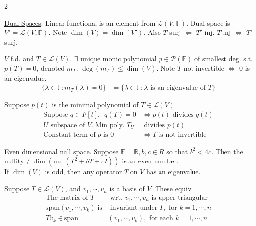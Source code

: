 \documentclass[a4paper,8pt]{extarticle} %
\newcommand{\mybox}[2]{
    \begin{tcolorbox}[colback=lightblue!5!white,colframe=lightblue!75!black,boxsep=1pt,arc=0pt,outer arc=0pt,coltext=black,title={\textcolor{black}{#1}}, before skip=2pt, after skip=2pt]
        #2
    \end{tcolorbox}
}
\begin{document}
\begin{multicols*}{2}
\mybox{Other (cont.)}{
\underline{Dual Spaces}: Linear functional is an element from $\mathcal{L}(V, \mathbb{F})$. Dual space is $V' = \mathcal{L}(V,\mathbb{F})$. Note $\dim(V)=\dim(V')$. Also $T$ surj $\Leftrightarrow$ $T'$ inj. $T$ inj $\Leftrightarrow$ $T'$ surj.
}

\mybox{Minimal Polynomial}{
$V$ f.d. and $T\in \mathcal{L}(V)$. $\exists$ \underline{unique} \underline{monic} polynomial $p \in \mathcal{P}(\mathbb{F})$ of smallest deg. s.t. $p(T)=0$, denoted $m_T$. $\deg(m_T)\leq \dim(V)$. Note $T$ not invertible $\Leftrightarrow$ $0$ is an eigenvalue.
\begin{subequations}
    \begin{align}
        \{\lambda \in \mathbb{F}:m_T(\lambda)=0\}&=\{\lambda\in\mathbb{F}:\lambda \text{ is an eigenvalue of } T\}
    \end{align}
\end{subequations}

Suppose $p(t)$ is the minimal polynomial of $T\in\mathcal{L}(V)$
\begin{subequations}
    \begin{align}
        \text{Suppose }q\in F[t]. \text{ }q(T)=0 &\Leftrightarrow p(t)\text{ divides }q(t)\\
        U\text{ subspace of } V. \text{ Min poly. $T_U$}&\text{ divides $p(t)$}\\
        \text{Constant term of $p$ is $0$}&\Leftrightarrow T \text{ is not invertible}
    \end{align}
\end{subequations}

Even dimensional null space. Suppose $\mathbb{F}=\mathbb{R}, b, c\in R$ so that $b^2<4c$. Then the nullity / $\dim(\text{null}(T^2+bT+cI))$ is an even number.\\

If $\dim(V)$ is odd, then any operator $T$ on $V$ has an eigenvalue.
}

\mybox{Triangularisation}{
Suppose $T \in \mathcal{L}(V)$, and $v_1, \cdots, v_n$ is a basis of $V$. These equiv.
\begin{subequations}
    \begin{align}
        \text{The matrix of $T$}&\text{ wrt. $v_1, \cdots, v_n$ is upper triangular}\\
        \text{span}(v_1, \cdots, v_k)\text{ is}&\text{ invariant under }T,\text{ for $k = 1,\cdots, n$}\\
        Tv_k\in\text{span}&(v_1, \cdots, v_k), \text{ for each $k = 1,\cdots,n$}
    \end{align}
\end{subequations}

}
\end{multicols*}
\end{document}
